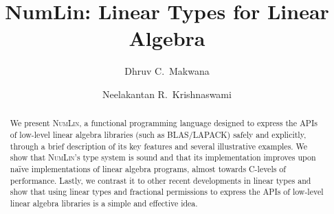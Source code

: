 \documentclass[a4paper,UKenglish]{lipics-v2019}
\title{NumLin: Linear Types for Linear Algebra}
\author{Dhruv C.~Makwana}{Unaffiliated \url{dhruvmakwana.com} }{dcm41@cam.ac.uk}{https://orcid.org/0000-0001-7220-4991}{}
\author{Neelakantan R.~Krishnaswami}{Department of Computer Science and Technology, University of Cambridge, United Kingdom}{nk480@cl.cam.ac.uk}{https://orcid.org/0000-0003-2838-5865}{}
\newcommand{\lang}{\textsc{NumLin}}
\begin{document}
\maketitle%

\begin{abstract}
    We present \lang, a functional programming language designed to express
    the APIs of low-level linear algebra libraries (such as BLAS/LAPACK) safely
    and explicitly, through a brief description of its key features and several
    illustrative examples. We show that \lang's type system is sound and that
    its implementation improves upon na{\"i}ve implementations of linear
    algebra programs, almost towards C-levels of performance. Lastly, we contrast
    it to other recent developments in linear types and show that using linear
    types and fractional permissions to express the APIs of low-level linear
    algebra libraries is a simple and effective idea.
\end{abstract}











\clearpage


\clearpage
\appendix

\end{document}
